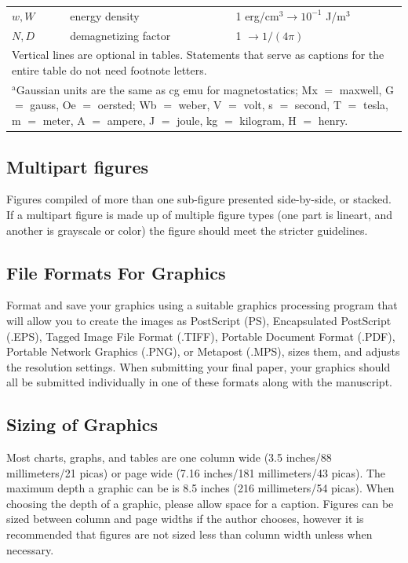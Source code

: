 \documentclass[journal,twoside,web]{ieeecolor}
\begin{document}
\begin{table}
\begin{tabular}{|p{25pt}|p{75pt}|p{115pt}|}
$w, W$& 
energy density& 
1 erg/cm$^{3} \to  10^{-1}$ J/m$^{3}$ \\
$N, D$& 
demagnetizing factor& 
1 $\to  1/(4\pi )$ \\
\hline
\multicolumn{3}{p{251pt}}{Vertical lines are optional in tables. Statements that serve as captions for 
the entire table do not need footnote letters. }\\
\multicolumn{3}{p{251pt}}{$^{\mathrm{a}}$Gaussian units are the same as cg emu for magnetostatics; Mx 
$=$ maxwell, G $=$ gauss, Oe $=$ oersted; Wb $=$ weber, V $=$ volt, s $=$ 
second, T $=$ tesla, m $=$ meter, A $=$ ampere, J $=$ joule, kg $=$ 
kilogram, H $=$ henry.}
\end{tabular}
\label{tab1}
\end{table}


\subsection{Multipart figures}
Figures compiled of more than one sub-figure presented side-by-side, or 
stacked. If a multipart figure is made up of multiple figure
types (one part is lineart, and another is grayscale or color) the figure 
should meet the stricter guidelines.

\subsection{File Formats For Graphics}\label{formats}
Format and save your graphics using a suitable graphics processing program 
that will allow you to create the images as PostScript (PS), Encapsulated 
PostScript (.EPS), Tagged Image File Format (.TIFF), Portable Document 
Format (.PDF), Portable Network Graphics (.PNG), or Metapost (.MPS), sizes them, and adjusts 
the resolution settings. When 
submitting your final paper, your graphics should all be submitted 
individually in one of these formats along with the manuscript.

\subsection{Sizing of Graphics}
Most charts, graphs, and tables are one column wide (3.5 inches/88 
millimeters/21 picas) or page wide (7.16 inches/181 millimeters/43 
picas). The maximum depth a graphic can be is 8.5 inches (216 millimeters/54
picas). When choosing the depth of a graphic, please allow space for a 
caption. Figures can be sized between column and page widths if the author 
chooses, however it is recommended that figures are not sized less than 
column width unless when necessary. 
\end{document}
